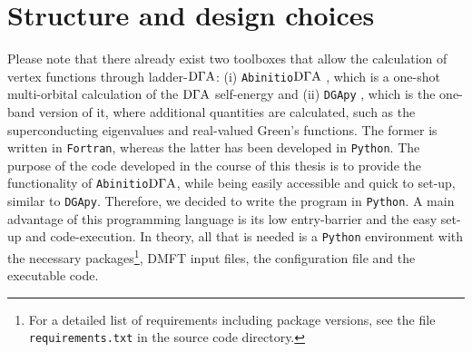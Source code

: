\documentclass[../../main.tex]{subfiles}
\begin{document}
\section{Structure and design choices}

Please note that there already exist two toolboxes that allow the calculation of vertex functions through ladder-$\text{D}\Gamma\text{A}$: (i) \texttt{Abinitio$\text{D}\Gamma\text{A}$} \cite{abinitio dga, anna galler thesis, abinitio dga project}, which is a one-shot multi-orbital calculation of the $\text{D}\Gamma\text{A}$ self-energy and (ii) \texttt{DGApy} \cite{dgapy}, which is the one-band version of it, where additional quantities are calculated, such as the superconducting eigenvalues and real-valued Green's functions. The former is written in \texttt{Fortran}, whereas the latter has been developed in \texttt{Python}.
The purpose of the code developed in the course of this thesis is to provide the functionality of \texttt{Abinitio$\text{D}\Gamma\text{A}$}, while being easily accessible and quick to set-up, similar to \texttt{DGApy}. Therefore, we decided to write the program in \texttt{Python}. A main advantage of this programming language is its low entry-barrier and the easy set-up and code-execution. In theory, all that is needed is a \texttt{Python} environment with the necessary packages\footnote{For a detailed list of requirements including package versions, see the file \texttt{requirements.txt} in the source code directory.}, DMFT input files, the configuration file and the executable code.
\end{document}
